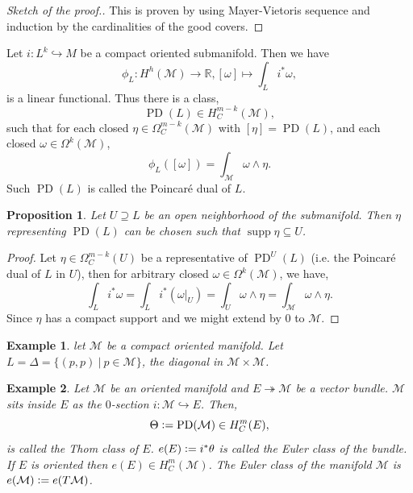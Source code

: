 \documentclass[8pt]{article}
\newtheorem{proposition}{Proposition}[section]
\newtheorem{example}{Example}[section]
\DeclareMathOperator{\supp}{supp}
\DeclareMathOperator{\PD}{PD}
\newcommand{\defeq}{\vcentcolon=}
\newcommand{\R}[0]{\mathbb{R}}
\newcommand{\M}[0]{\mathcal{M}}
\newcommand{\sep}[0]{\:|\:}
\begin{document}
\begin{proof}[Sketch of the proof.]
  This is proven by using Mayer-Vietoris sequence and induction by the cardinalities of the good covers.
\end{proof}
Let $i:L^k\hookrightarrow M$ be a compact oriented submanifold. Then we have 
\begin{equation*}
  \phi_L:H^h(\M)\to\R, [\omega]\mapsto\int_L i^*\omega,
\end{equation*}
is a linear functional. Thus there is a class, 
\begin{equation*}
  \PD(L) \in H^{m-k}_C(\M),
\end{equation*}
such that for each closed $\eta\in\Omega_C^{m-k}(\M)$ with $[\eta]=\PD(L)$, and each closed $\omega\in\Omega^k(\M)$,
\begin{equation*}
  \phi_L([\omega]) = \int_\M\omega\wedge\eta.
\end{equation*}
Such $\PD(L)$ is called the Poincaré dual of $L$.
\begin{proposition}
  Let $U\supseteq L$ be an open neighborhood of the submanifold. Then $\eta$ representing $\PD(L)$ can be chosen such that $\supp\eta\subseteq U$.
\end{proposition}
\begin{proof}
  Let $\eta\in\Omega^{m-k}_C(U)$ be a representative of $\PD^U(L)$ (i.e. the Poincaré dual of $L$ in $U$), then for arbitrary closed $\omega\in\Omega^k(\M)$, we have,
  \begin{equation*}
    \int_Li^*\omega=\int_Li^*(\omega|_U)=\int_U\omega\wedge\eta=\int_\M\omega\wedge\eta.
  \end{equation*}
  Since $\eta$ has a compact support and we might extend by $0$ to $\M$.
\end{proof}
\begin{example}
  let $\M$ be a compact oriented manifold. Let $L=\Delta=\{(p,p)\sep p\in\M\}$, the diagonal in $\M\times\M$. 
\end{example}
\begin{example}
  Let $\M$ be an oriented manifold and $E\twoheadrightarrow\M$ be a vector bundle. $\M$ sits inside $E$ as the $0$-section $i:\M\hookrightarrow E$. Then,
  \begin{equation*}
    \Theta\defeq\PD(\M)\in H_C^m(E),
  \end{equation*}
  is called the Thom class of $E$. $e(E)\defeq i^*\theta$ is called the Euler class of the bundle. If $E$ is oriented then $e(E)\in H_C^m(\M)$. The Euler class of the manifold $\M$ is $e(\M)\defeq e(T\M)$.
\end{example}
\end{document}
